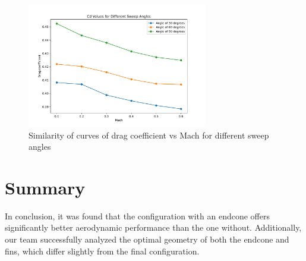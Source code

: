 \documentclass{article}
\begin{document}
\begin{figure}[H]
    \centering
    \includegraphics[width=0.7\textwidth]{../data/R6-Parametric-Fins/CDvsMach.pdf}
    \caption{Similarity of curves of drag coefficient vs Mach for different sweep angles}
\end{figure}

\section{Summary}
In conclusion, it was found that the configuration with an endcone offers significantly better 
aerodynamic performance than the one without. Additionally, our team successfully analyzed the 
optimal geometry of both the endcone and fins, which differ slightly from the final configuration.
\end{document}
